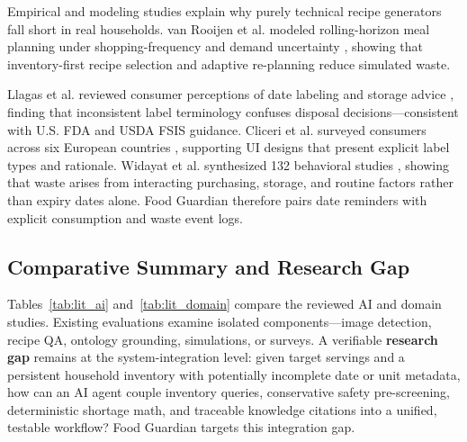 Empirical and modeling studies explain why purely technical recipe generators fall short in real households. van Rooijen et al. modeled rolling-horizon meal planning under shopping-frequency and demand uncertainty \cite{ref7}, showing that inventory-first recipe selection and adaptive re-planning reduce simulated waste.

Llagas et al. reviewed consumer perceptions of date labeling and storage advice \cite{ref8}, finding that inconsistent label terminology confuses disposal decisions---consistent with U.S. FDA \cite{ref2} and USDA FSIS \cite{ref11} guidance. Cliceri et al. surveyed consumers across six European countries \cite{ref9}, supporting UI designs that present explicit label types and rationale. Widayat et al. synthesized 132 behavioral studies \cite{ref10}, showing that waste arises from interacting purchasing, storage, and routine factors rather than expiry dates alone. Food Guardian therefore pairs date reminders with explicit consumption and waste event logs.

\subsection{Comparative Summary and Research Gap}

Tables~\ref{tab:lit_ai} and~\ref{tab:lit_domain} compare the reviewed AI and domain studies. Existing evaluations examine isolated components---image detection, recipe QA, ontology grounding, simulations, or surveys. A verifiable \textbf{research gap} remains at the system-integration level: given target servings and a persistent household inventory with potentially incomplete date or unit metadata, how can an AI agent couple inventory queries, conservative safety pre-screening, deterministic shortage math, and traceable knowledge citations into a unified, testable workflow? Food Guardian targets this integration gap.

